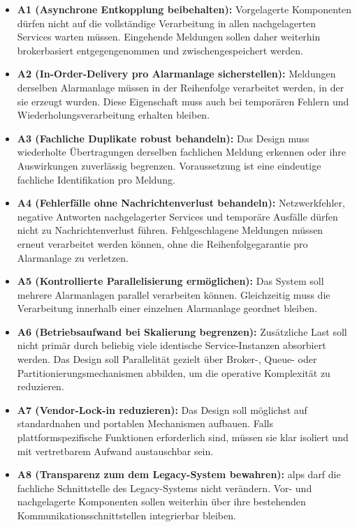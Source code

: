 \begin{itemize}
    \item \textbf{A1 (Asynchrone Entkopplung beibehalten):} Vorgelagerte Komponenten dürfen nicht auf die vollständige Verarbeitung in allen nachgelagerten Services warten müssen. Eingehende Meldungen sollen daher weiterhin brokerbasiert entgegengenommen und zwischengespeichert werden.

    \item \textbf{A2 (In-Order-Delivery pro Alarmanlage sicherstellen):} Meldungen derselben Alarmanlage müssen in der Reihenfolge verarbeitet werden, in der sie erzeugt wurden. Diese Eigenschaft muss auch bei temporären Fehlern und Wiederholungsverarbeitung erhalten bleiben.

    \item \textbf{A3 (Fachliche Duplikate robust behandeln):} Das Design muss wiederholte Übertragungen derselben fachlichen Meldung erkennen oder ihre Auswirkungen zuverlässig begrenzen. Voraussetzung ist eine eindeutige fachliche Identifikation pro Meldung.

    \item \textbf{A4 (Fehlerfälle ohne Nachrichtenverlust behandeln):} Netzwerkfehler, negative Antworten nachgelagerter Services und temporäre Ausfälle dürfen nicht zu Nachrichtenverlust führen. Fehlgeschlagene Meldungen müssen erneut verarbeitet werden können, ohne die Reihenfolgegarantie pro Alarm\-an\-la\-ge zu verletzen.

    \item \textbf{A5 (Kontrollierte Parallelisierung ermöglichen):} Das System soll mehrere Alarmanlagen parallel verarbeiten können. Gleichzeitig muss die Verarbeitung innerhalb einer einzelnen Alarmanlage geordnet bleiben.

    \item \textbf{A6 (Betriebsaufwand bei Skalierung begrenzen):} Zusätzliche Last soll nicht primär durch beliebig viele identische Service-Instanzen absorbiert werden. Das Design soll Parallelität gezielt über Broker-, Queue- oder Partitionierungsmechanismen abbilden, um die operative Komplexität zu reduzieren.

    \item \textbf{A7 (Vendor-Lock-in reduzieren):} Das Design soll möglichst auf standardnahen und portablen Mechanismen aufbauen. Falls plattformspezifische Funktionen erforderlich sind, müssen sie klar isoliert und mit vertretbarem Aufwand austauschbar sein.

    \item \textbf{A8 (Transparenz zum dem Legacy-System bewahren):} \gls{alps} darf die fachliche Schnittstelle des Legacy-Systems nicht verändern. Vor- und nachgelagerte Komponenten sollen weiterhin über ihre bestehenden Kommunikationsschnittstellen integrierbar bleiben.
\end{itemize}


